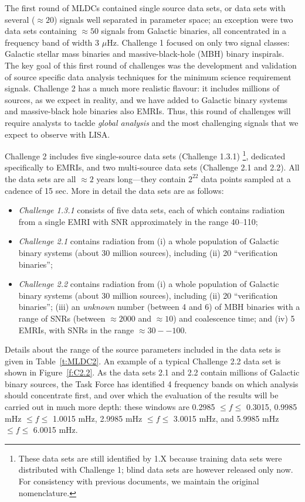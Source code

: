 \documentclass[12pt]{iopart}
\begin{document}
The first round of MLDCs contained single source data sets, or data sets with several ($\approx 20$) signals well separated in parameter space; an exception were two data sets containing $\approx 50$ signals from Galactic binaries, all concentrated in a frequency band of width 3 $\mu$Hz. Challenge 1 focused on only two signal classes: Galactic stellar mass binaries and massive-black-hole (MBH) binary inspirals. The key goal of this first round of challenges was the development and validation of source specific data analysis techniques for the minimum science requirement signals. Challenge 2 has a much more realistic flavour: it includes millions of sources, as we expect in reality, and we have added to Galactic binary systems and massive-black hole binaries also EMRIs. Thus, this round of challenges will require analysts to tackle \emph{global analysis} and the most challenging signals that we expect to observe with LISA. 

Challenge 2 includes five single-source data sets (Challenge 1.3.1)%
\footnote{These data sets are still identified by 1.X because training data sets were distributed with Challenge 1; blind data sets are however released only now. For consistency with previous documents, we maintain the original nomenclature.},
% 
dedicated specifically to EMRIs, and two multi-source data sets (Challenge 2.1 and 2.2). All the data sets are all $\approx 2$ years long---they contain $2^{22}$ data points sampled at a cadence of 15 sec. More in detail the data sets are as follows: 
\begin{itemize}
\item \emph{Challenge 1.3.1} consists of five data sets, each of which contains radiation from a single EMRI with SNR approximately in the range 40--110;
\item \emph{Challenge 2.1} contains radiation from (i) a whole population of Galactic binary systems (about 30 million sources), including (ii) 20 ``verification binaries'';
\item \emph{Challenge 2.2} contains radiation from (i) a whole population of Galactic binary systems (about 30 million sources), including (ii) 20 ``verification binaries''; (iii) an \emph{unknown} number (between 4 and 6) of MBH binaries with a range of SNRs (between $\approx 2000$ and $\approx 10$) and coalescence time; and (iv) 5 EMRIs, with SNRs in the range $\approx 30--100$.
\end{itemize}
Details about the range of the source parameters included in the data sets is given in Table~\ref{t:MLDC2}. An example of a typical Challenge 2.2 data set is shown in Figure~\ref{f:C2.2}. As the data sets 2.1 and 2.2 contain millions of Galactic binary sources, the Task Force has identified 4 frequency bands on which analysis should concentrate first, and over which the evaluation of the results will be carried out in much more depth: these windows  are 0.2985 $\le f \le$ 0.3015, 0.9985 mHz $\le f \le$ 1.0015 mHz, 2.9985 mHz $\le f \le$ 3.0015 mHz, and 5.9985 mHz $\le f \le$ 6.0015 mHz.  
\end{document}
